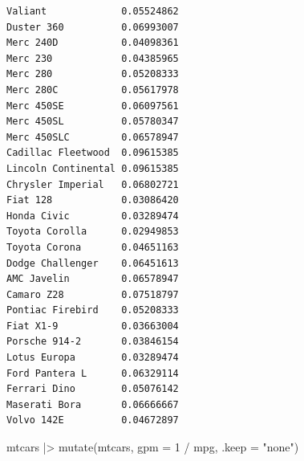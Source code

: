 \documentclass[
  letterpaper,
  DIV=11,
  numbers=noendperiod]{scrreprt}
\newenvironment{Shaded}{\begin{snugshade}}{\end{snugshade}}
\newcommand{\AttributeTok}[1]{\textcolor[rgb]{0.40,0.45,0.13}{#1}}
\newcommand{\DecValTok}[1]{\textcolor[rgb]{0.68,0.00,0.00}{#1}}
\newcommand{\FunctionTok}[1]{\textcolor[rgb]{0.28,0.35,0.67}{#1}}
\newcommand{\NormalTok}[1]{\textcolor[rgb]{0.00,0.23,0.31}{#1}}
\newcommand{\SpecialCharTok}[1]{\textcolor[rgb]{0.37,0.37,0.37}{#1}}
\newcommand{\StringTok}[1]{\textcolor[rgb]{0.13,0.47,0.30}{#1}}
\begin{document}
\begin{verbatim}
Valiant             0.05524862
Duster 360          0.06993007
Merc 240D           0.04098361
Merc 230            0.04385965
Merc 280            0.05208333
Merc 280C           0.05617978
Merc 450SE          0.06097561
Merc 450SL          0.05780347
Merc 450SLC         0.06578947
Cadillac Fleetwood  0.09615385
Lincoln Continental 0.09615385
Chrysler Imperial   0.06802721
Fiat 128            0.03086420
Honda Civic         0.03289474
Toyota Corolla      0.02949853
Toyota Corona       0.04651163
Dodge Challenger    0.06451613
AMC Javelin         0.06578947
Camaro Z28          0.07518797
Pontiac Firebird    0.05208333
Fiat X1-9           0.03663004
Porsche 914-2       0.03846154
Lotus Europa        0.03289474
Ford Pantera L      0.06329114
Ferrari Dino        0.05076142
Maserati Bora       0.06666667
Volvo 142E          0.04672897
\end{verbatim}

\begin{Shaded}
\begin{Highlighting}[]
\NormalTok{mtcars }\SpecialCharTok{|\textgreater{}} \FunctionTok{mutate}\NormalTok{(mtcars, }\AttributeTok{gpm =} \DecValTok{1} \SpecialCharTok{/}\NormalTok{ mpg, }\AttributeTok{.keep =} \StringTok{"none"}\NormalTok{)}
\end{Highlighting}
\end{Shaded}
\end{document}
